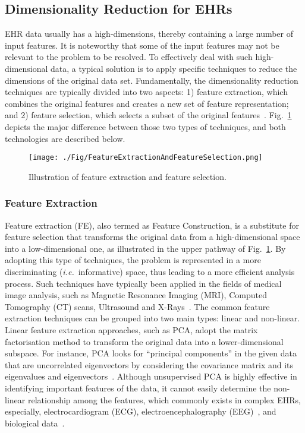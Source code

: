 \documentclass{article}
\newcommand{\zzie}{\emph{i.e.}~}
\newcommand*{\1}{\textcolor{magenta}}
\begin{document}
	\subsection{Dimensionality Reduction for EHRs}\label{sec:relatedworks}
	EHR data usually has a high-dimensions, thereby containing a large number of input features. It is noteworthy that some of the input features may not be relevant to the problem to be resolved. To effectively deal with such high-dimensional data, a typical solution is to apply specific techniques to reduce the dimensions of the original data set. Fundamentally, the dimensionality reduction techniques are typically divided into two aspects: 1) feature extraction, which combines the original features and creates a new set of feature representation; and 2) feature selection, which selects a subset of the original features~\cite{remeseiro2019review}. Fig.~\ref{fig:fe-fs} depicts the major difference between those two types of techniques, and both technologies are described below.  
	


	\begin{figure}[!htbp]
	\centering
	\texttt{[image: ./Fig/FeatureExtractionAndFeatureSelection.png]}
	\caption{Illustration of feature extraction and feature selection.}\label{fig:fe-fs}
\end{figure}
	
	
	\subsubsection{Feature Extraction}\label{sec:fe}
	Feature extraction (FE), also termed as Feature Construction, is a substitute for feature selection that transforms the original data from a high-dimensional space into a low-dimensional one, as illustrated in the upper pathway of Fig.~\ref{fig:fe-fs}. By adopting this type of techniques, the problem is represented in a more discriminating (\zzie informative) space, thus leading to a more efficient analysis process. Such techniques have typically been applied in the fields of medical image analysis, such as Magnetic Resonance Imaging (MRI), Computed Tomography (CT) scans, Ultrasound and X-Rays~\cite{remeseiro2019review}. The common feature extraction techniques can be grouped into two main types: linear and non-linear. Linear feature extraction approaches, such as PCA, adopt the matrix factorisation method to transform the original data into a lower-dimensional subspace. For instance, PCA looks for ``principal components'' in the given data that are uncorrelated eigenvectors by considering the covariance matrix and its eigenvalues and eigenvectors~\cite{zuo2018gaze}. Although unsupervised PCA is highly effective in identifying important features of the data, it cannot easily determine the non-linear relationship among the features, which commonly exists in complex EHRs, especially, electrocardiogram (ECG), electroencephalography (EEG)~\cite{al2017enhanced}, and biological data~\cite{remeseiro2019review}. 
	
\end{document}
